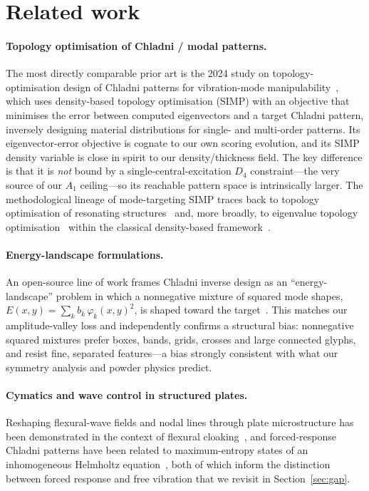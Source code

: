 \documentclass[11pt,a4paper]{article}
\newcommand{\Aone}{A_1}
\newcommand{\Dfour}{D_4}
\begin{document}
\section{Related work}\label{sec:related}

\paragraph{Topology optimisation of Chladni / modal patterns.}
The most directly comparable prior art is the 2024 study on topology-optimisation
design of Chladni patterns for vibration-mode manipulability~\cite{acta2024},
which uses density-based topology optimisation (SIMP) with an objective that
minimises the error between computed eigenvectors and a target Chladni pattern,
inversely designing material distributions for single- and multi-order patterns.
Its eigenvector-error objective is cognate to our own scoring evolution, and its
SIMP density variable is close in spirit to our density/thickness field. The key
difference is that it is \emph{not} bound by a single-central-excitation $\Dfour$
constraint---the very source of our $\Aone$ ceiling---so its reachable pattern
space is intrinsically larger. The methodological lineage of mode-targeting SIMP
traces back to topology optimisation of resonating structures~\cite{tcherniak2002}
and, more broadly, to eigenvalue topology
optimisation~\cite{pedersen2000,achtziger2007} within the classical
density-based framework~\cite{bendsoe1989,bendsoe1999,bendsoe2003}.

\paragraph{Energy-landscape formulations.}
An open-source line of work frames Chladni inverse design as an
``energy-landscape'' problem in which a nonnegative mixture of squared mode shapes,
$E(x,y)=\sum_k b_k\,\varphi_k(x,y)^2$, is shaped toward the
target~\cite{bellette}. This matches our amplitude-valley loss and independently
confirms a structural bias: nonnegative squared mixtures prefer boxes, bands,
grids, crosses and large connected glyphs, and resist fine, separated features---a
bias strongly consistent with what our symmetry analysis and powder physics
predict.

\paragraph{Cymatics and wave control in structured plates.}
Reshaping flexural-wave fields and nodal lines through plate microstructure has
been demonstrated in the context of flexural cloaking~\cite{misseroni2016}, and
forced-response Chladni patterns have been related to maximum-entropy states of
an inhomogeneous Helmholtz equation~\cite{tuanchen}, both of which inform the
distinction between forced response and free vibration that we revisit in
Section~\ref{sec:gap}.
\end{document}

